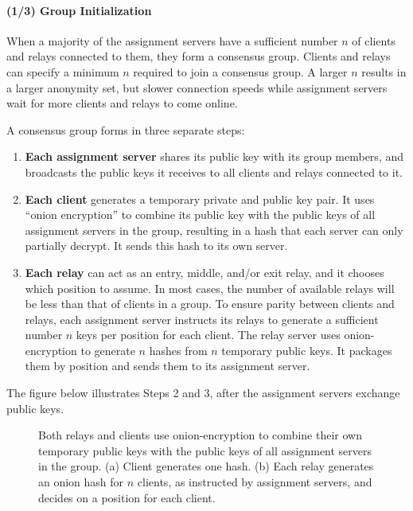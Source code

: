 \paragraph{(1/3) Group Initialization}

When a majority of the assignment servers have a sufficient number $n$ of clients
and relays connected to them, they form a consensus group. Clients and relays can specify a minimum $n$ required to join a consensus group. A larger $n$ results in a larger anonymity set, but slower connection speeds while assignment servers
wait for more clients and relays to come online.

A consensus group forms in three separate steps:

\begin{enumerate} 
\item \textbf{Each assignment server} shares its public key with its group members, and
broadcasts the public keys it receives to all clients and relays connected to it. 

\item \textbf{Each client} generates a temporary private and public key pair. It
uses ``onion encryption'' to combine its public key with the public keys of all assignment servers in the group, resulting in a hash that each server can only
partially decrypt. It sends this hash to its own server.

\item \textbf{Each relay} can act as an entry, middle, and/or exit relay, and it chooses which position to assume. In most cases, the number of available relays
will be less than that of clients in a group. To ensure parity between clients
and relays, each assignment server instructs its relays to generate a sufficient
number $n$ keys per position for each client. The relay server uses onion-encryption to generate $n$ hashes from $n$ temporary public keys. It packages them by position and sends them to its assignment server.
\end{enumerate}

The figure below illustrates Steps 2 and 3, after the assignment servers
exchange public keys.

\begin{figure}[htbp]
  \centering
  \caption{Both relays and clients use onion-encryption to combine their own
  temporary public keys with the public keys of all assignment servers in the group. (a) Client generates one hash. (b) Each relay generates an onion hash for $n$ clients, as instructed by assignment servers, and decides on a position
  for each client.}
\end{figure}

